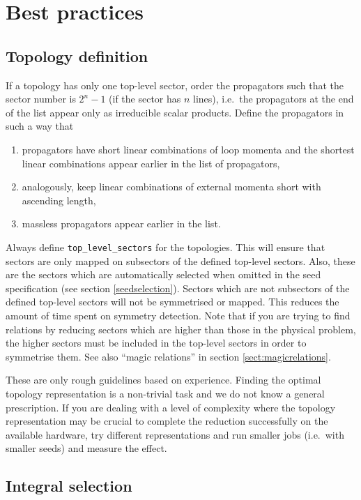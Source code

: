\documentclass[a4paper,12pt]{article}
\begin{document}
\section{Best practices}
\label{sect:bestpractices}

\subsection{Topology definition}

If a topology has only one top-level sector, order the propagators such that the
sector number is $2^n-1$ (if the sector has $n$ lines), i.e.\ the propagators at
the end of the list appear only as irreducible scalar products.
Define the propagators in such a way that
%
\begin{enumerate}
  \item propagators have short linear combinations of loop momenta and the
        shortest linear combinations appear earlier in the list of propagators,
  \item analogously, keep linear combinations of external momenta short with
        ascending length,
  \item massless propagators appear earlier in the list.
\end{enumerate}
%
Always define \texttt{top\_level\_sectors} for the topologies.
This will ensure that sectors are only mapped on subsectors of the defined
top-level sectors.
Also, these are the sectors which are automatically selected when omitted in the
seed specification (see section \ref{seedselection}).
Sectors which are not subsectors of the defined top-level sectors will not be
symmetrised or mapped.
This reduces the amount of time spent on symmetry detection.
Note that if you are trying to find relations by reducing sectors which are
higher than those in the physical problem, the higher sectors must be included
in the top-level sectors in order to symmetrise them.
See also ``magic relations'' in section \ref{sect:magicrelations}.

These are only rough guidelines based on experience.
Finding the optimal topology representation is a non-trivial task and we do not
know a general prescription.
If you are dealing with a level of complexity where the topology representation
may be crucial to complete the reduction successfully on the available hardware,
try different representations and run smaller jobs (i.e.\ with smaller seeds)
and measure the effect.


\subsection{Integral selection}
\end{document}
